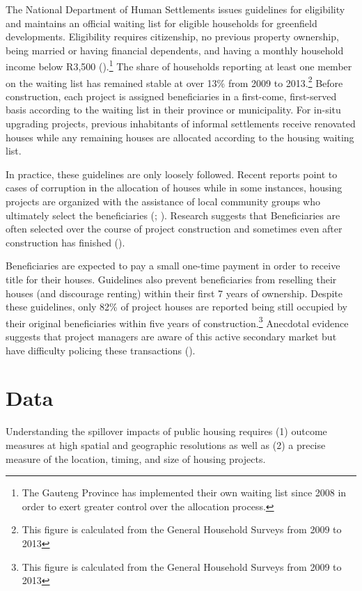 \documentclass[12pt]{article}
\begin{document}
The National Department of Human Settlements issues guidelines for eligibility and maintains an official waiting list for eligible households for greenfield developments.  Eligibility requires citizenship, no previous property ownership, being married or having financial dependents, and having a monthly household income below R3,500 (\cite{seriq}).\footnote{The Gauteng Province has implemented their own waiting list since 2008 in order to exert greater control over the allocation process.}  The share of households reporting at least one member on the waiting list has remained stable at over 13\% from 2009 to 2013.\footnote{This figure is calculated from the General Household Surveys from 2009 to 2013}  Before construction, each project is assigned beneficiaries in a first-come, first-served basis according to the waiting list in their province or municipality.  For in-situ upgrading projects, previous inhabitants of informal settlements receive renovated houses while any remaining houses are allocated according to the housing waiting list.

In practice, these guidelines are only loosely followed.  Recent reports point to cases of corruption in the allocation of houses while in some instances, housing projects are organized with the assistance of local community groups who ultimately select the beneficiaries (\cite{seriq}; \cite{casestudytinazonke}).  Research suggests that Beneficiaries are often selected over the course of project construction and sometimes even after construction has finished (\cite{seriq}).

Beneficiaries are expected to pay a small one-time payment in order to receive title for their houses.  Guidelines also prevent beneficiaries from reselling their houses (and discourage renting) within their first 7 years of ownership.  Despite these guidelines, only 82\% of project houses are reported being still occupied by their original beneficiaries within five years of construction.\footnote{This figure is calculated from the General Household Surveys from 2009 to 2013}  Anecdotal evidence suggests that project managers are aware of this active secondary market but have difficulty policing these transactions (\cite{resale}).

\section{Data}

Understanding the spillover impacts of public housing requires (1) outcome measures at high spatial and geographic resolutions as well as (2) a precise measure of the location, timing, and size of housing projects.  
\end{document}
